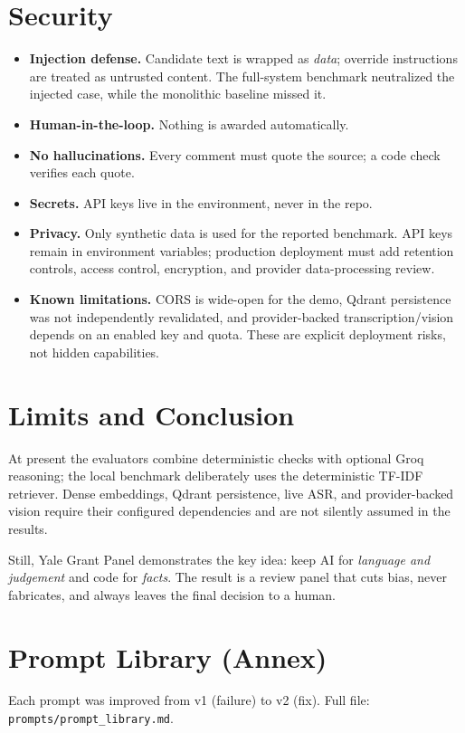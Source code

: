 \documentclass[11pt,a4paper]{article}
\begin{document}
\section{Security}
\begin{itemize}
  \item \textbf{Injection defense.} Candidate text is wrapped as \emph{data}; override instructions are treated as untrusted content. The full-system benchmark neutralized the injected case, while the monolithic baseline missed it.
  \item \textbf{Human-in-the-loop.} Nothing is awarded automatically.
  \item \textbf{No hallucinations.} Every comment must quote the source; a code check verifies each quote.
  \item \textbf{Secrets.} API keys live in the environment, never in the repo.
  \item \textbf{Privacy.} Only synthetic data is used for the reported benchmark. API keys remain in environment variables; production deployment must add retention controls, access control, encryption, and provider data-processing review.
  \item \textbf{Known limitations.} CORS is wide-open for the demo, Qdrant persistence was not independently revalidated, and provider-backed transcription/vision depends on an enabled key and quota. These are explicit deployment risks, not hidden capabilities.
\end{itemize}

\enlargethispage{3cm}
\section{Limits and Conclusion}
At present the evaluators combine deterministic checks with optional Groq reasoning; the local benchmark deliberately uses the deterministic TF-IDF retriever. Dense embeddings, Qdrant persistence, live ASR, and provider-backed vision require their configured dependencies and are not silently assumed in the results.

Still, Yale Grant Panel demonstrates the key idea: keep AI for \emph{language and judgement} and code for \emph{facts}. The result is a review panel that cuts bias, never fabricates, and always leaves the final decision to a human.

\newpage
\appendix
\section{Prompt Library (Annex)}
Each prompt was improved from v1 (failure) to v2 (fix). Full file: \texttt{prompts/prompt\_library.md}.
\end{document}
